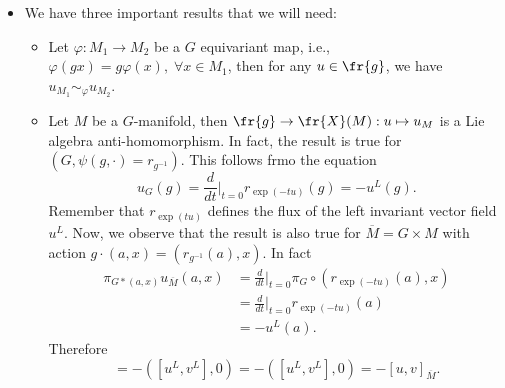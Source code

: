 \begin{itemize}
\begin{example}
\begin{equation}
\begin{split}
                &=\frac{d}{dt}\bigg|_{t=0}d_{\exp(tu)}r_{\exp(-tu)}(v^L(\exp(tu)))\\
                &=\frac{d}{dt}\bigg|_{t=0} r_{\exp(tu)*}(v^L)\big|_e\\
                &=\mathcal{L}_{u^L}(v^L)\big|_e\\
                &=[u^L,v^L]_e\\
                &=[u,v].
            \end{split}
        \end{equation}
        Therefore $\Ad_{*,e}=\ad$.
    \end{example}
    \item We have three important results that we will need: 
        \begin{itemize}
            \item[1.] Let $\varphi:M_1\to M_2$ be a $G$ equivariant map, i.e., $\varphi(gx)=g\varphi(x),\;\forall x\in M_1$, then 
            for any $u\in\fr{g}$, we have $u_{M_1}\sim_\varphi u_{M_2}$.
            \item[2.] Let $M$ be a $G$-manifold, then $\fr{g}\to\fr{X}(M):u\mapsto u_M$ is a Lie algebra anti-homomorphism. 
            In fact, the result is true for $(G,\psi(g,\cdot)=r_{g^{-1}})$. This follows frmo the equation 
            \begin{equation}
                u_G(g)=\frac{d}{dt}\bigg|_{t=0}r_{\exp(-tu)}(g)=-u^L(g).
            \end{equation}
            Remember that $r_{\exp(tu)}$ defines the flux of the left invariant vector field $u^L$. Now, we observe that 
            the result is also true for $\overline{M}=G\times M$ with action $g\cdot(a,x)=(r_{g^{-1}}(a),x)$. In fact 
            \begin{equation}
                \begin{split}
                    \pi_{G*(a,x)}u_{\overline{M}}(a,x)&=\frac{d}{dt}\bigg|_{t=0}\pi_G\circ(r_{\exp(-tu)}(a),x)\\
                    &=\frac{d}{dt}\bigg|_{t=0}r_{\exp(-tu)}(a)\\
                    &=-u^L(a).
                \end{split}
            \end{equation}
            Therefore
            \begin{equation}
                [u_{\overline{M}},v_{\overline{M}}]=
                -([u^L,v^L],0)=
                -([u^L,v^L],0)=
                -[u,v]_{\overline{M}}.
            \end{equation}

\end{itemize}
\end{itemize}
